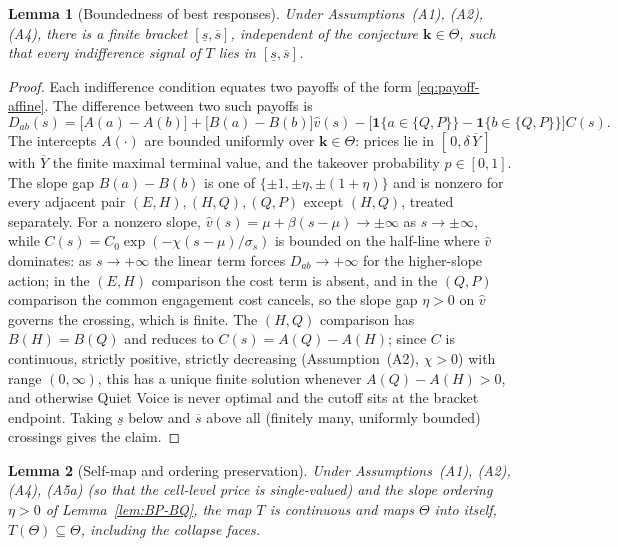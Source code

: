 \documentclass[11pt]{article}
\newtheorem{lemma}{Lemma}
\newcommand{\1}{\mathbf{1}}
\providecommand{\kvec}{\mathbf{k}}
\providecommand{\Tmap}{T}
\providecommand{\vhat}{\hat{v}}
\providecommand{\deltaliq}{\delta}
\providecommand{\Ccost}{C}
\providecommand{\chivar}{\chi}
\begin{document}
\begin{lemma}[Boundedness of best responses]
\label{lem:bounded}
Under Assumptions~\textup{(A1)}, \textup{(A2)}, \textup{(A4)}, there is a finite bracket $[\underline{s},\overline{s}]$, independent of the conjecture $\kvec\in\Theta$, such that every indifference signal of $\Tmap$ lies in $[\underline{s},\overline{s}]$.
\end{lemma}

\begin{proof}
Each indifference condition equates two payoffs of the form \eqref{eq:payoff-affine}. The difference between two such payoffs is
\begin{equation}
\label{eq:diff}
D_{ab}(s)=\bigl[A(a)-A(b)\bigr]+\bigl[B(a)-B(b)\bigr]\vhat(s)
-\bigl[\1\{a\in\{Q,P\}\}-\1\{b\in\{Q,P\}\}\bigr]\Ccost(s).
\end{equation}
The intercepts $A(\cdot)$ are bounded uniformly over $\kvec\in\Theta$: prices lie in $[\,0,\deltaliq\,\overline{Y}\,]$ with $\overline{Y}$ the finite maximal terminal value, and the takeover probability $p\in[0,1]$. The slope gap $B(a)-B(b)$ is one of $\{\pm1,\pm\eta,\pm(1+\eta)\}$ and is nonzero for every adjacent pair $(E,H),(H,Q),(Q,P)$ except $(H,Q)$, treated separately. For a nonzero slope, $\vhat(s)=\mu+\beta(s-\mu)\to\pm\infty$ as $s\to\pm\infty$, while $\Ccost(s)=C_0\exp(-\chivar(s-\mu)/\sigma_s)$ is bounded on the half-line where $\vhat$ dominates: as $s\to+\infty$ the linear term forces $D_{ab}\to+\infty$ for the higher-slope action; in the $(E,H)$ comparison the cost term is absent, and in the $(Q,P)$ comparison the common engagement cost cancels, so the slope gap $\eta>0$ on $\vhat$ governs the crossing, which is finite. The $(H,Q)$ comparison has $B(H)=B(Q)$ and reduces to $\Ccost(s)=A(Q)-A(H)$; since $\Ccost$ is continuous, strictly positive, strictly decreasing (Assumption~\textup{(A2)}, $\chivar>0$) with range $(0,\infty)$, this has a unique finite solution whenever $A(Q)-A(H)>0$, and otherwise Quiet Voice is never optimal and the cutoff sits at the bracket endpoint. Taking $\underline{s}$ below and $\overline{s}$ above all (finitely many, uniformly bounded) crossings gives the claim.
\end{proof}

\begin{lemma}[Self-map and ordering preservation]
\label{lem:selfmap}
Under Assumptions~\textup{(A1)}, \textup{(A2)}, \textup{(A4)}, \textup{(A5a)} (so that the cell-level price is single-valued) and the slope ordering $\eta>0$ of Lemma~\ref{lem:BP-BQ}, the map $\Tmap$ is continuous and maps $\Theta$ into itself, $\Tmap(\Theta)\subseteq\Theta$, including the collapse faces.
\end{lemma}
\end{document}
